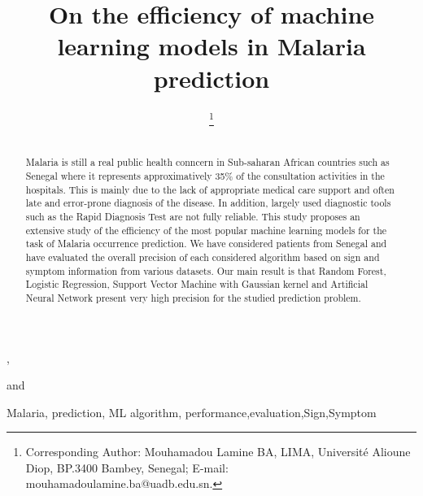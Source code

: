\documentclass{IOS-Book-Article}
\def\hb{\hbox to 10.7 cm{}}
\def\hb{\hbox to 10.7 cm{}}
\begin{document}
\pagestyle{headings}
\def\thepage{}

\begin{frontmatter}              %

\title{On the efficiency of machine learning models in Malaria prediction}

\markboth{}{January 2020\hb}

\author{ },
\author{ 
\thanks{Corresponding Author: Mouhamadou Lamine BA, LIMA, Universit\'e Alioune Diop,
BP.3400 Bambey, Senegal; E-mail: mouhamadoulamine.ba@uadb.edu.sn.}}
and
\author{ }

\address{LIMA, Universit\'e Alioune Diop, Bambey, Senegal}

\begin{abstract}\\
Malaria is still a real public health conncern in Sub-saharan African countries such as Senegal where it represents approximatively 35\% of the consultation activities in the hospitals. This is mainly due to the lack of appropriate medical care support and often late and error-prone diagnosis of the disease. In addition, largely used diagnostic tools such as the Rapid Diagnosis Test are not fully reliable. This study proposes an extensive study of the efficiency of the most popular  machine learning models for the task of Malaria occurrence prediction. We have considered patients from Senegal and have evaluated the overall precision of each considered algorithm based on sign and symptom information from various datasets. Our main result is that Random Forest, Logistic Regression, Support Vector Machine with Gaussian kernel and Artificial Neural Network present very high precision for the studied prediction problem.
\end{abstract}

\begin{keyword}
Malaria, prediction, ML algorithm, 
performance\sep evaluation\sep Sign\sep Symptom
\end{keyword}
\end{frontmatter}
\scriptsize


\end{document}
